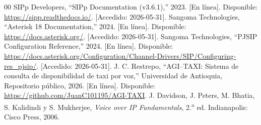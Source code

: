 \documentclass[conference]{IEEEtran}
\begin{document}
\begin{thebibliography}{00}
 SIPp Developers, ``SIPp Documentation (v3.6.1),''
2023. [En l\'inea]. Disponible: \url{https://sipp.readthedocs.io/}.
[Accedido: 2026-05-31].
 Sangoma Technologies, ``Asterisk 18
Documentation,'' 2024. [En l\'inea]. Disponible:
\url{https://docs.asterisk.org/}. [Accedido: 2026-05-31].
 Sangoma Technologies, ``PJSIP Configuration
Reference,'' 2024. [En l\'inea]. Disponible:
\url{https://docs.asterisk.org/Configuration/Channel-Drivers/SIP/Configuring-res_pjsip/}.
[Accedido: 2026-05-31].
 J. C. Restrepo, ``AGI--TAXI: Sistema de consulta
de disponibilidad de taxi por voz,'' Universidad de Antioquia,
Repositorio p\'ublico, 2026. [En l\'inea]. Disponible:
\url{https://github.com/JuanC101195/AGI-TAXI}.
 J. Davidson, J. Peters, M. Bhatia,
S. Kalidindi y S. Mukherjee, \textit{Voice over IP Fundamentals},
2.\textsuperscript{a} ed. Indianapolis: Cisco Press, 2006.
\end{thebibliography}
\end{document}
